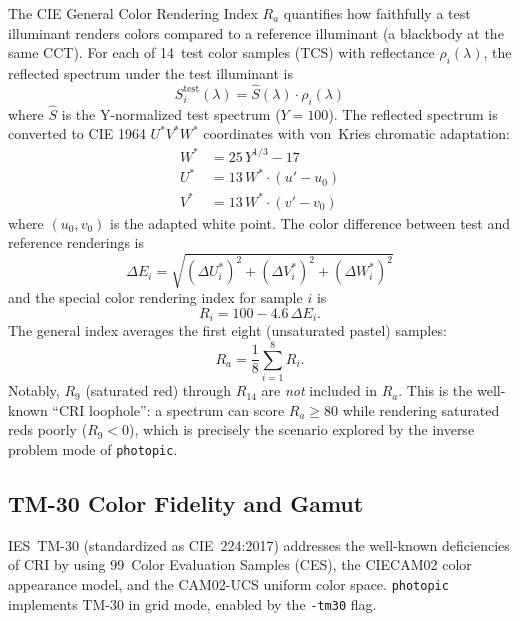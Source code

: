 \documentclass[11pt]{article}
\newcommand{\photopic}{\texttt{photopic}}
\newcommand{\cmd}[1]{\texttt{#1}}
\begin{document}
The CIE General Color Rendering Index $R_a$ quantifies how faithfully
a test illuminant renders colors compared to a reference illuminant
(a blackbody at the same CCT).  For each of 14~test color samples
(TCS) with reflectance $\rho_i(\lambda)$, the reflected spectrum
under the test illuminant is
\begin{equation}
  S_i^{\text{test}}(\lambda) =
    \hat{S}(\lambda) \cdot \rho_i(\lambda)
  \label{eq:reflected}
\end{equation}
where $\hat{S}$ is the Y-normalized test spectrum ($Y = 100$).
The reflected spectrum is converted to CIE 1964 $U^*V^*W^*$
coordinates with von~Kries chromatic adaptation:
\begin{align}
  W^* &= 25\, Y^{1/3} - 17 \\
  U^* &= 13\, W^* \cdot (u' - u_0) \\
  V^* &= 13\, W^* \cdot (v' - v_0)
  \label{eq:uvw}
\end{align}
where $(u_0, v_0)$ is the adapted white point.  The color difference
between test and reference renderings is
\begin{equation}
  \Delta E_i = \sqrt{
    (\Delta U^*_i)^2 + (\Delta V^*_i)^2 + (\Delta W^*_i)^2
  }
\end{equation}
and the special color rendering index for sample $i$ is
\begin{equation}
  R_i = 100 - 4.6 \, \Delta E_i.
  \label{eq:ri}
\end{equation}
The general index averages the first eight (unsaturated pastel) samples:
\begin{equation}
  R_a = \frac{1}{8} \sum_{i=1}^{8} R_i.
  \label{eq:cri}
\end{equation}
Notably, $R_9$ (saturated red) through $R_{14}$ are \emph{not}
included in $R_a$.  This is the well-known ``CRI loophole'': a
spectrum can score $R_a \geq 80$ while rendering saturated reds
poorly ($R_9 < 0$), which is precisely the scenario explored by the
inverse problem mode of \photopic{}.

\subsection{TM-30 Color Fidelity and Gamut}
\label{sec:tm30-math}

IES~TM-30 (standardized as CIE~224:2017) addresses the well-known
deficiencies of CRI by using 99~Color Evaluation Samples (CES),
the CIECAM02 color appearance model, and the CAM02-UCS uniform color
space.  \photopic{} implements TM-30 in grid mode, enabled by the
\cmd{-tm30} flag.
\end{document}
